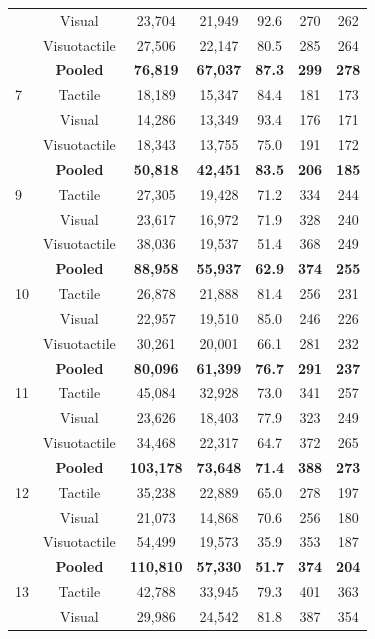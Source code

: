 \begin{longtable}{lcccccc}
 & Visual & 23,704 & 21,949 & 92.6 & 270 & 262 \\
 & Visuotactile & 27,506 & 22,147 & 80.5 & 285 & 264 \\
\textbf{} & \textbf{Pooled} & \textbf{76,819} & \textbf{67,037} & \textbf{87.3} & \textbf{299} & \textbf{278} \\
7 & Tactile & 18,189 & 15,347 & 84.4 & 181 & 173 \\
 & Visual & 14,286 & 13,349 & 93.4 & 176 & 171 \\
 & Visuotactile & 18,343 & 13,755 & 75.0 & 191 & 172 \\
\textbf{} & \textbf{Pooled} & \textbf{50,818} & \textbf{42,451} & \textbf{83.5} & \textbf{206} & \textbf{185} \\
9 & Tactile & 27,305 & 19,428 & 71.2 & 334 & 244 \\
 & Visual & 23,617 & 16,972 & 71.9 & 328 & 240 \\
 & Visuotactile & 38,036 & 19,537 & 51.4 & 368 & 249 \\
\textbf{} & \textbf{Pooled} & \textbf{88,958} & \textbf{55,937} & \textbf{62.9} & \textbf{374} & \textbf{255} \\
10 & Tactile & 26,878 & 21,888 & 81.4 & 256 & 231 \\
 & Visual & 22,957 & 19,510 & 85.0 & 246 & 226 \\
 & Visuotactile & 30,261 & 20,001 & 66.1 & 281 & 232 \\
\textbf{} & \textbf{Pooled} & \textbf{80,096} & \textbf{61,399} & \textbf{76.7} & \textbf{291} & \textbf{237} \\
11 & Tactile & 45,084 & 32,928 & 73.0 & 341 & 257 \\
 & Visual & 23,626 & 18,403 & 77.9 & 323 & 249 \\
 & Visuotactile & 34,468 & 22,317 & 64.7 & 372 & 265 \\
\textbf{} & \textbf{Pooled} & \textbf{103,178} & \textbf{73,648} & \textbf{71.4} & \textbf{388} & \textbf{273} \\
12 & Tactile & 35,238 & 22,889 & 65.0 & 278 & 197 \\
 & Visual & 21,073 & 14,868 & 70.6 & 256 & 180 \\
 & Visuotactile & 54,499 & 19,573 & 35.9 & 353 & 187 \\
\textbf{} & \textbf{Pooled} & \textbf{110,810} & \textbf{57,330} & \textbf{51.7} & \textbf{374} & \textbf{204} \\
13 & Tactile & 42,788 & 33,945 & 79.3 & 401 & 363 \\
 & Visual & 29,986 & 24,542 & 81.8 & 387 & 354 \\

\end{longtable}
